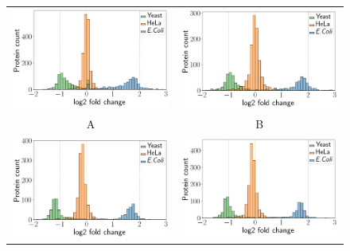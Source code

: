 \documentclass[10pt,letterpaper]{article}
\begin{document}
\begin{figure}[hbt]
    \centering
    \begin{tabular}{cc}
	    \includegraphics[width=0.4\linewidth]{../../result/report_plots_pipeline/histogram_ID_triqler.png} & 
	    \includegraphics[width=0.4\linewidth]{../../result/report_plots_pipeline/histogram_ID_top3.png} \\ 
        A & B \\ 
	    \includegraphics[width=0.4\linewidth]{../../result/report_plots_pipeline/histogram_ID_msstats.png} & 
	    \includegraphics[width=0.4\linewidth]{../../result/report_plots_pipeline/histogram_ID_msqrob2.png} \\

\end{tabular}
\end{figure}
\end{document}
